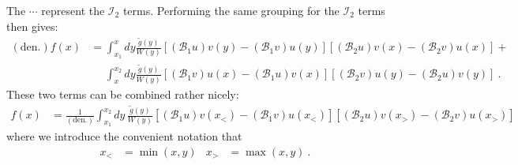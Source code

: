The $\cdots$ represent the $\mathcal I_2$ terms. Performing the same grouping for the $\mathcal I_2$ terms then gives:
\begin{align}
	(\text{den.})f(x)&=
	\int_{x_1}^x dy \frac{\tilde g(y)}{W(y)}
	\left[
		(\mathcal B_1u)v(y) - (\mathcal B_1v)u(y)
	\right] 
	\left[
		(\mathcal B_2u)v(x) - (\mathcal B_2v)u(x)
	\right] + \\
	&\phantom{=}
	\int_{x}^{x_2} dy \frac{\tilde g(y)}{W(y)}
	\left[
		(\mathcal B_1v)u(x) - (\mathcal B_1u)v(x)
	\right] 
	\left[
		(\mathcal B_2v)u(y) - (\mathcal B_2u)v(y)
	\right] \ .
\end{align}
These two terms can be combined rather nicely:
\begin{align}
	f(x) &=
	\frac{1}{(\text{den.})}
	\int_{x_1}^{x_2} dy \,
	\frac{\tilde g(y)}{W(y)}
	\left[
		(\mathcal B_1u)v(x_<) - (\mathcal B_1v)u(x_<)
	\right] 
	\left[
		(\mathcal B_2u)v(x_>) - (\mathcal B_2v)u(x_>)
	\right]
\end{align}
where we introduce the convenient notation that
\begin{align}
	x_< &= \min(x,y)
	&
	x_> &= \max(x,y) \ .
\end{align}
